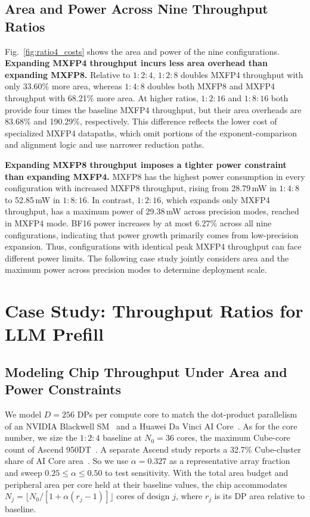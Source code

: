 \documentclass[conference,10pt,letterpaper]{IEEEtran}
\begin{document}
\subsection{Area and Power Across Nine Throughput Ratios}
\label{sec:lowp_costs}

Fig.~\ref{fig:ratio4_costs} shows the area and power of the nine configurations. \textbf{Expanding MXFP4 throughput incurs less area overhead than expanding MXFP8.} Relative to $1:2:4$, $1:2:8$ doubles MXFP4 throughput with only 33.60\% more area, whereas $1:4:8$ doubles both MXFP8 and MXFP4 throughput with 68.21\% more area. At higher ratios, $1:2:16$ and $1:8:16$ both provide four times the baseline MXFP4 throughput, but their area overheads are 83.68\% and 190.29\%, respectively. This difference reflects the lower cost of specialized MXFP4 datapaths, which omit portions of the exponent-comparison and alignment logic and use narrower reduction paths.

\textbf{Expanding MXFP8 throughput imposes a tighter power constraint than expanding MXFP4.} MXFP8 has the highest power consumption in every configuration with increased MXFP8 throughput, rising from 28.79\,mW in $1:4:8$ to 52.85\,mW in $1:8:16$. In contrast, $1:2:16$, which expands only MXFP4 throughput, has a maximum power of 29.38\,mW across precision modes, reached in MXFP4 mode. BF16 power increases by at most 6.27\% across all nine configurations, indicating that power growth primarily comes from low-precision expansion. Thus, configurations with identical peak MXFP4 throughput can face different power limits. The following case study jointly considers area and the maximum power across precision modes to determine deployment scale.



\section{Case Study: Throughput Ratios for LLM Prefill}
\label{sec:workload}

\subsection{Modeling Chip Throughput Under Area and Power Constraints}
We model $D=256$ DPs per compute core to match the dot-product parallelism of an NVIDIA Blackwell SM~\cite{nvidia2025blackwellbrief,tirumala2024blackwell} and a Huawei Da Vinci AI Core~\cite{liao2019davinci}. As for the core number, we size the $1:2:4$ baseline at $N_0=36$ cores, the maximum Cube-core count of Ascend 950DT~\cite{huawei950}. A separate Ascend study reports a 32.7\% Cube-cluster share of AI Core area~\cite{luo2024hifloat8area}. So we use $\alpha=0.327$ as a representative array fraction and sweep $0.25\le\alpha\le0.50$ to test sensitivity. With the total area budget and peripheral area per core held at their baseline values, the chip accommodates $N_j=\lfloor N_0/[1+\alpha(r_j-1)]\rfloor$ cores of design $j$, where $r_j$ is its DP area relative to baseline.
\end{document}
